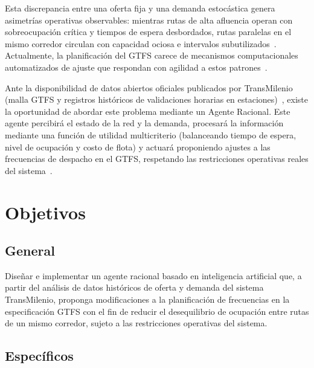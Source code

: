 \documentclass{article}
\begin{document}
Esta discrepancia entre una oferta fija y una demanda estocástica genera asimetrías operativas observables: mientras rutas de alta afluencia operan con sobreocupación crítica y tiempos de espera desbordados, rutas paralelas en el mismo corredor circulan con capacidad ociosa e intervalos subutilizados~\cite{bogotacomovamos2024encuesta,yang2020multiobjective}. Actualmente, la planificación del GTFS carece de mecanismos computacionales automatizados de ajuste que respondan con agilidad a estos patrones~\cite{yang2020multiobjective}. 

Ante la disponibilidad de datos abiertos oficiales publicados por TransMilenio (malla GTFS y registros históricos de validaciones horarias en estaciones)~\cite{transmilenio2026datosabiertos}, existe la oportunidad de abordar este problema mediante un Agente Racional. Este agente percibirá el estado de la red y la demanda, procesará la información mediante una función de utilidad multicriterio (balanceando tiempo de espera, nivel de ocupación y costo de flota) y actuará proponiendo ajustes a las frecuencias de despacho en el GTFS, respetando las restricciones operativas reales del sistema~\cite{yang2020multiobjective,russell2020artificial}. 



\section{Objetivos}

\subsection{General}

Diseñar e implementar un agente racional basado en inteligencia artificial que, a partir del análisis de datos históricos de oferta y demanda del sistema TransMilenio, proponga modificaciones a la planificación de frecuencias en la especificación GTFS con el fin de reducir el desequilibrio de ocupación entre rutas de un mismo corredor, sujeto a las restricciones operativas del sistema. 

 
\subsection{Específicos}
\end{document}
